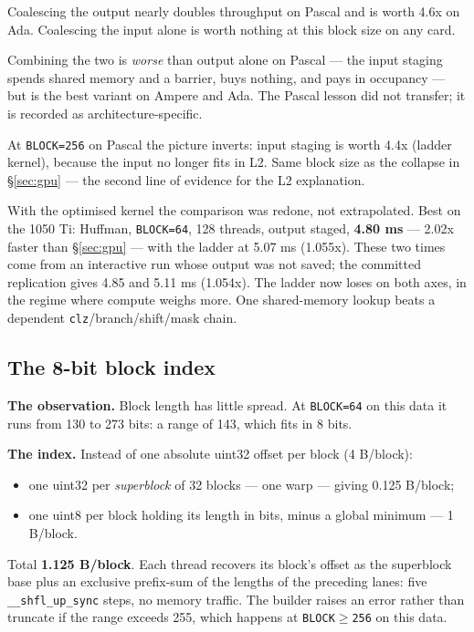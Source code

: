 \documentclass[11pt,a4paper]{article}
\newcommand{\code}[1]{\texttt{#1}}
\newcommand{\B}[1]{\textbf{#1}}
\begin{document}
Coalescing the output nearly doubles throughput on Pascal and is worth 4.6x on Ada. Coalescing the input alone is worth nothing at this block size on any card.

Combining the two is \emph{worse} than output alone on Pascal --- the input staging spends shared memory and a barrier, buys nothing, and pays in occupancy --- but is the best variant on Ampere and Ada. The Pascal lesson did not transfer; it is recorded as architecture-specific.

At \code{BLOCK=256} on Pascal the picture inverts: input staging is worth 4.4x (ladder kernel), because the input no longer fits in L2. Same block size as the collapse in \S\ref{sec:gpu} --- the second line of evidence for the L2 explanation.

With the optimised kernel the comparison was redone, not extrapolated. Best on the 1050 Ti: Huffman, \code{BLOCK=64}, 128 threads, output staged, \B{4.80 ms} --- 2.02x faster than \S\ref{sec:gpu} --- with the ladder at 5.07 ms (1.055x). These two times come from an interactive run whose output was not saved; the committed replication gives 4.85 and 5.11 ms (1.054x). The ladder now loses on both axes, in the regime where compute weighs more. One shared-memory lookup beats a dependent \code{clz}/branch/shift/mask chain.

\subsection{The 8-bit block index}\label{sec:index}

\B{The observation.} Block length has little spread. At \code{BLOCK=64} on this data it runs from 130 to 273 bits: a range of 143, which fits in 8 bits.

\B{The index.} Instead of one absolute uint32 offset per block (4 B/block):
\begin{itemize}
\item one uint32 per \emph{superblock} of 32 blocks --- one warp --- giving 0.125 B/block;
\item one uint8 per block holding its length in bits, minus a global minimum --- 1 B/block.
\end{itemize}

Total \B{1.125 B/block}. Each thread recovers its block's offset as the superblock base plus an exclusive prefix-sum of the lengths of the preceding lanes: five \code{\_\_shfl\_up\_sync} steps, no memory traffic. The builder raises an error rather than truncate if the range exceeds 255, which happens at \code{BLOCK$\geq$256} on this data.
\end{document}
